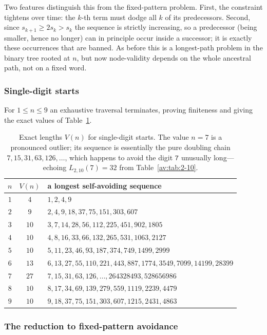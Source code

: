 \documentclass[a4paper]{article}
\theoremstyle{plain}
\theoremstyle{definition}
\theoremstyle{remark}
\newcommand{\Lbb}[1][b,B]{L_{#1}}
\begin{document}
Two features distinguish this from the fixed-pattern problem. First, the constraint tightens over time: the $k$-th term must dodge all $k$ of its predecessors. Second, since $s_{k+1}\ge 2s_k>s_k$ the sequence is strictly increasing, so a predecessor (being smaller, hence no longer) can in principle occur inside a successor; it is exactly these occurrences that are banned. As before this is a longest-path problem in the binary tree rooted at $n$, but now node-validity depends on the whole ancestral path, not on a fixed word.

\subsubsection{Single-digit starts}

For $1\le n\le 9$ an exhaustive traversal terminates, proving finiteness and giving the exact values of Table~\ref{av:tab:variant}.

\begin{table}[h]
\centering
\begin{tabular}{ccl}
\toprule
$n$ & $V(n)$ & a longest self-avoiding sequence \\
\midrule
$1$ & $4$  & $1,2,4,9$ \\
$2$ & $9$  & $2,4,9,18,37,75,151,303,607$ \\
$3$ & $10$ & $3,7,14,28,56,112,225,451,902,1805$ \\
$4$ & $10$ & $4,8,16,33,66,132,265,531,1063,2127$ \\
$5$ & $10$ & $5,11,23,46,93,187,374,749,1499,2999$ \\
$6$ & $13$ & $6,13,27,55,110,221,443,887,1774,3549,7099,14199,28399$ \\
$7$ & $27$ & $7,15,31,63,126,\dots,264328493,528656986$ \\
$8$ & $10$ & $8,17,34,69,139,279,559,1119,2239,4479$ \\
$9$ & $10$ & $9,18,37,75,151,303,607,1215,2431,4863$ \\
\bottomrule
\end{tabular}
\caption{Exact lengths $V(n)$ for single-digit starts. The value $n=7$ is a pronounced outlier; its sequence is essentially the pure doubling chain $7,15,31,63,126,\dots$, which happens to avoid the digit $\texttt{7}$ unusually long---echoing $\Lbb[2,10](7)=32$ from Table~\ref{av:tab:2-10}.}
\label{av:tab:variant}
\end{table}

\subsubsection{The reduction to fixed-pattern avoidance}
\end{document}
